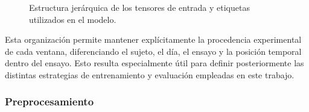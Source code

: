\begin{figure}[H]
    \centering
    \caption{Estructura jerárquica de los tensores de entrada y etiquetas utilizados en el modelo.}
    \label{fig:tensor_input}
\end{figure}


Esta organización permite mantener explícitamente la procedencia experimental de cada ventana, diferenciando el sujeto, el día, el ensayo y la posición temporal dentro del ensayo. Esto resulta especialmente útil para definir posteriormente las distintas estrategias de entrenamiento y evaluación empleadas en este trabajo.


\subsubsection{Preprocesamiento}


